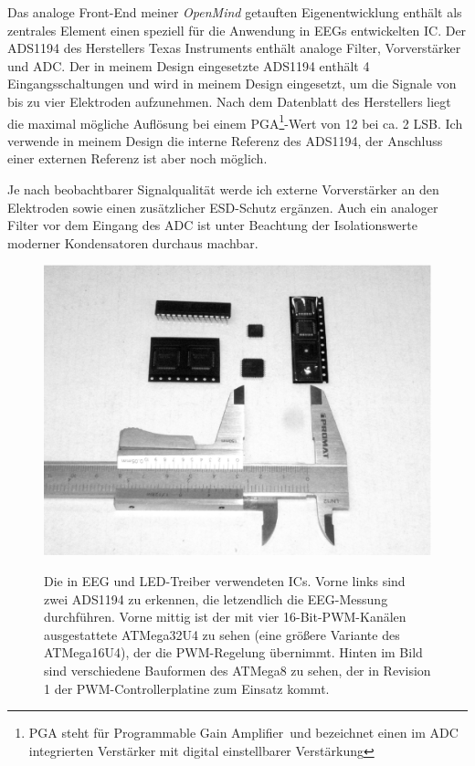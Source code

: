 \documentclass[12pt,a4paper,notitlepage]{article}
\begin{document}
Das analoge Front-End meiner \emph{OpenMind} getauften Eigenentwicklung enthält als zentrales Element einen speziell für die Anwendung in \glspl{EEG} entwickelten \gls{IC}. Der ADS1194 des Herstellers Texas Instruments enthält analoge Filter, Vorverstärker und ADC\cite{TEXAS1}. Der in meinem Design eingesetzte ADS1194 enthält 4 Eingangsschaltungen und wird in meinem Design eingesetzt, um die Signale von bis zu vier Elektroden aufzunehmen. Nach dem Datenblatt des Herstellers liegt die maximal mögliche Auflösung bei einem PGA\footnote{PGA steht für \glqq Programmable Gain Amplifier\grqq\ und bezeichnet einen im ADC integrierten Verstärker mit digital einstellbarer Verstärkung}-Wert von 12 bei ca. 2 \gls{LSB}. Ich verwende in meinem Design die interne Referenz des ADS1194, der Anschluss einer externen Referenz ist aber noch möglich\cite{TEXAS1,TEXAS11,ANALOG6,LINEAR6,MAXIM6}.

Je nach beobachtbarer Signalqualität werde ich externe Vorverstärker an den Elektroden sowie einen zusätzlicher ESD-Schutz ergänzen. Auch ein analoger Filter vor dem Eingang des ADC ist unter Beachtung der Isolationswerte moderner Kondensatoren durchaus machbar\cite{PHILIPS3,PHILIPS4,PHILIPS5,PHILIPS6,WIMA1,STM1,CHEEVER1,NATIONAL2,MAXIM45}.

\begin{figure}
\centering
\includegraphics[width=15cm]{images/chips_smaller.eps}
\label{ics_used}
\caption{Die in EEG und LED-Treiber verwendeten ICs. Vorne links sind zwei ADS1194 zu erkennen, die letzendlich die EEG-Messung durchführen. Vorne mittig ist der mit vier 16-Bit-PWM-Kanälen ausgestattete ATMega32U4 zu sehen (eine größere Variante des ATMega16U4), der die PWM-Regelung übernimmt. Hinten im Bild sind verschiedene Bauformen des ATMega8 zu sehen, der in Revision 1 der PWM-Controllerplatine zum Einsatz kommt.}
\end{figure}
\end{document}
